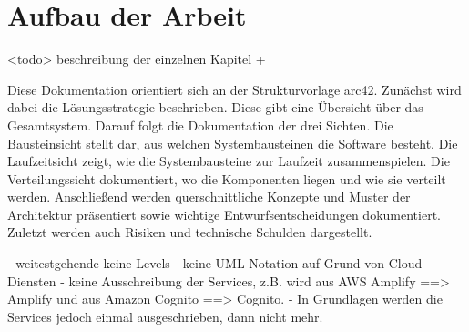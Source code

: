 \section{Aufbau der Arbeit}

<todo> beschreibung der einzelnen Kapitel +

Diese Dokumentation orientiert sich an der Strukturvorlage arc42\autocite{starke2007strukturvorlage}. Zunächst wird dabei die Lösungsstrategie beschrieben. Diese gibt eine Übersicht über das Gesamtsystem. Darauf folgt die Dokumentation der drei Sichten. Die Bausteinsicht stellt dar, aus welchen Systembausteinen die Software besteht. Die Laufzeitsicht zeigt, wie die Systembausteine zur Laufzeit zusammenspielen. Die Verteilungssicht dokumentiert, wo die Komponenten liegen und wie sie verteilt werden. Anschließend werden querschnittliche Konzepte und Muster der Architektur präsentiert sowie wichtige Entwurfsentscheidungen dokumentiert. Zuletzt werden auch Risiken und technische Schulden dargestellt.

- weitestgehende keine Levels
- keine UML-Notation auf Grund von Cloud-Diensten
- keine Ausschreibung der Services, z.B. wird aus AWS Amplify ==> Amplify und aus Amazon Cognito ==> Cognito.
- In Grundlagen werden die Services jedoch einmal ausgeschrieben, dann nicht mehr.